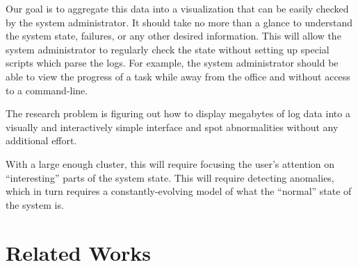 \documentclass[conference]{acmsiggraph}
\begin{document}
Our goal is to aggregate this data into a visualization that can be easily checked by the system
administrator. It should take no more than a glance to understand the system state, failures, or any
other desired information. This will allow the system administrator to regularly check the state
without setting up special scripts which parse the logs. For example, the system administrator
should be able to view the progress of a task while away from the office and without access to a
command-line.

The research problem is figuring out how to display megabytes of log data into a visually and
interactively simple interface and spot abnormalities without any additional effort.

With a large enough cluster, this will require focusing the user’s attention on “interesting” parts
of the system state. This will require detecting anomalies, which in turn requires a
constantly-evolving model of what the “normal” state of the system is.


\section{Related Works}
\end{document}
